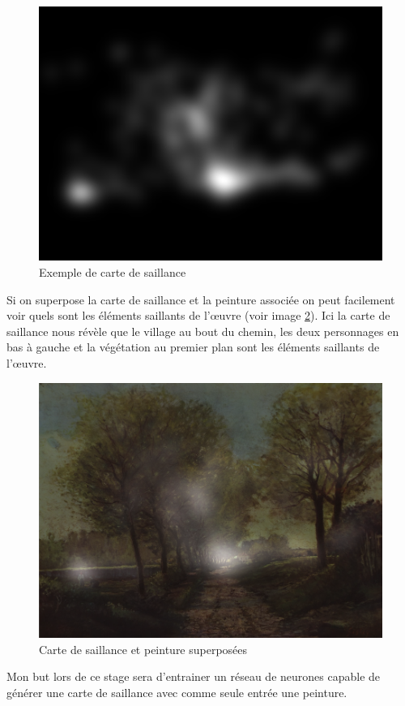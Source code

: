 \begin{figure}[!ht]
    \centering
    \includegraphics[width=0.7\linewidth]{datas/exemple_saliency_map.png}
    \caption{Exemple de carte de saillance}
    \label{ex_saliency_map}
\end{figure}

\par
Si on superpose la carte de saillance et la peinture associée on peut facilement voir quels sont les éléments saillants de l'\oe{}uvre (voir image \ref{saliency_map_transparency}). Ici la carte de saillance nous révèle que le village au bout du chemin, les deux personnages en bas à gauche et la végétation au premier plan sont les éléments saillants de l'\oe{}uvre.

\begin{figure}[!ht]
    \centering
    \includegraphics[width=0.7\linewidth]{datas/exemple_saliency_map_transparency.png}
    \caption{Carte de saillance et peinture superposées}
    \label{saliency_map_transparency}
\end{figure}

\par
Mon but lors de ce stage sera d'entrainer un réseau de neurones capable de générer une carte de saillance avec comme seule entrée une peinture. 

